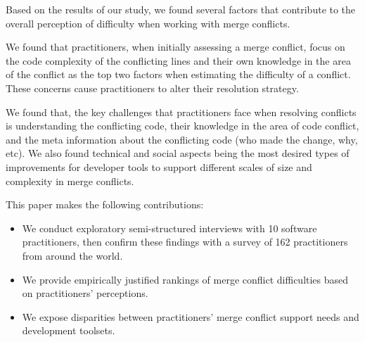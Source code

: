 Based on the results of our study, we found several factors that contribute to the overall perception of difficulty when working with merge conflicts.

We found that practitioners, when initially assessing a merge conflict, focus on the code complexity of the conflicting lines and their own knowledge in the area of the conflict as the top two factors when estimating the difficulty of a conflict. These concerns cause practitioners to alter their resolution strategy.

We found that, the key challenges that practitioners face when resolving conflicts is understanding the conflicting code, their knowledge in the area of code conflict, and the meta information about the conflicting code (who made the change, why, etc).
We also found technical and social aspects being the most desired types of improvements for developer tools to support different scales of size and complexity in merge conflicts.

This paper makes the following contributions:
\begin{itemize}
\item We conduct exploratory semi-structured interviews with 10 software practitioners, then confirm these findings with a survey of 162 practitioners from around the world.
\item We provide empirically justified rankings of merge conflict difficulties based on practitioners' perceptions.
\item We expose disparities between practitioners' merge conflict support needs and development toolsets.
\end{itemize}